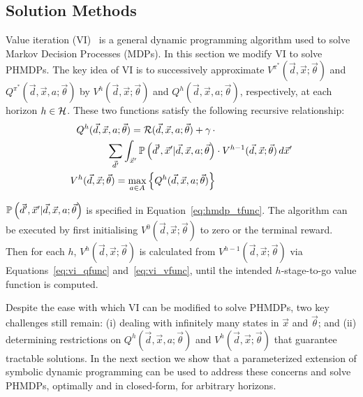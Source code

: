 \subsection{Solution Methods}

Value iteration (VI)~\parencite{Bellman_PU_1957} is a general dynamic programming algorithm used to solve Markov Decision Processes (MDPs). In this section we modify VI to solve PHMDPs. The key idea of VI is to successively approximate {\footnotesize $V^{\pi^{*}}(\vec{d}, \vec{x}; \vec{\theta})$} and {\footnotesize $Q^{\pi^{*}}(\vec{d}, \vec{x}, a; \vec{\theta})$} by {\footnotesize $V^{h}(\vec{d}, \vec{x}; \vec{\theta})$} and
{\footnotesize $Q^{h}(\vec{d}, \vec{x}, a; \vec{\theta})$}, respectively, at each horizon {\footnotesize$h \in \mathcal{H}$}. These two functions satisfy the following recursive relationship:
{\footnotesize 
    \abovedisplayskip=0pt
    \belowdisplayskip=0pt
    \begin{align}
        Q^{h}(\vec{d}, \vec{x}, a; \vec{\theta}) = \mathcal{R}(\vec{d}, \vec{x}, a; \vec{\theta}) + \gamma \, \cdot &  \nonumber \\ 
        \sum_{\vec{d}'} \int_{\vec{x}'} \mathbb{P}\left({\vec{d}', \vec{x}' | \vec{d}, \vec{x}, a; \vec{\theta}}\right) & \cdot V^{h-1}(\vec{d}, \vec{x}; \vec{\theta}) \, d\vec{x}'  \label{eq:vi_qfunc} \\
        V^{h}(\vec{d}, \vec{x}; \vec{\theta}) = \max_{a \in A} \left\{ Q^{h}(\vec{d}, \vec{x}, a; \vec{\theta}) \right\} & \label{eq:vi_vfunc}
    \end{align}
}%

{\footnotesize $\mathbb{P}\left({\vec{d}', \vec{x}' | \vec{d}, \vec{x}, a; \vec{\theta}}\right)$ } is specified in Equation~\eqref{eq:hmdp_tfunc}. The algorithm can be executed by first initialising {\footnotesize   $V^{0}(\vec{d}, \vec{x}; \vec{\theta})$} to zero or the terminal reward. Then for each {\footnotesize$h$}, {\footnotesize $V^{h}(\vec{d}, \vec{x}; \vec{\theta})$} is calculated from {\footnotesize $V^{h-1}(\vec{d}, \vec{x}; \vec{\theta})$} via Equations~\eqref{eq:vi_qfunc} and~\eqref{eq:vi_vfunc}, until the intended $h$-stage-to-go value function is computed.

Despite the ease with which VI can be modified to solve PHMDPs, two key challenges still remain: (i) dealing with infinitely many states in {\footnotesize $\vec{x}$} and {\footnotesize $\vec{\theta}$}; and (ii) determining restrictions on {\footnotesize $Q^{h}(\vec{d}, \vec{x}, a; \vec{\theta})$} and {\footnotesize $V^{h}(\vec{d}, \vec{x}; \vec{\theta})$} that guarantee tractable solutions. In the next section we show that a parameterized extension of symbolic dynamic programming can be used to address these concerns and solve PHMDPs, optimally and in closed-form, for arbitrary horizons.